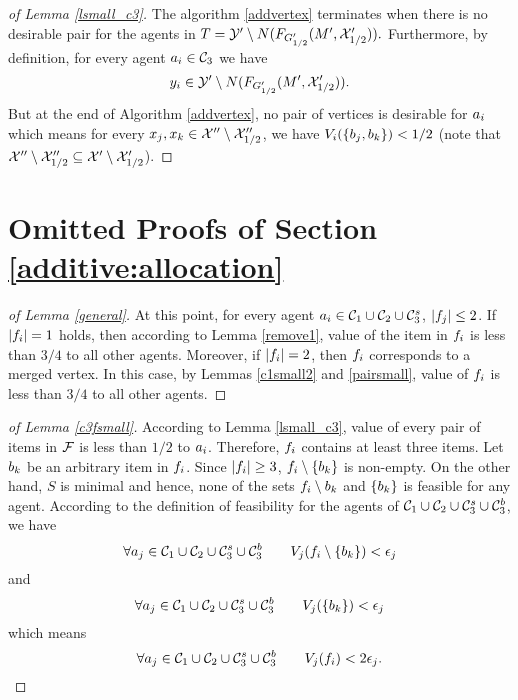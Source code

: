 \begin{proof}[of Lemma \ref{lsmall_c3}] The algorithm \ref{addvertex} terminates when there is no desirable pair for the agents in $T = \mathcal{Y}' \setminus N(F_{G'_{1/2}}(M',\mathcal{X}'_{1/2})).$ Furthermore, by definition, for every agent  $a_i \in \mathcal{C}_3$ we have  $$y_i \in \mathcal{Y}' \setminus N(F_{G'_{1/2}}(M',\mathcal{X}'_{1/2})).$$ But at the end of Algorithm \ref{addvertex}, no pair of vertices is desirable for $a_i$ which means for every $x_j,x_k \in \mathcal{X}'' \setminus \mathcal{X}''_{1/2}$, we have  $V_i(\{b_j,b_k\}) < {1/2}$ (note that $\mathcal{X}'' \setminus \mathcal{X}''_{1/2} \subseteq \mathcal{X}' \setminus \mathcal{X}'_{1/2}$).
\end{proof}


\section{Omitted Proofs of Section \ref{additive:allocation}}\label{clustering2appendix}
\begin{proof}[of Lemma \ref{general}]
At this point, for every agent $a_i \in \mathcal{C}_1 \cup \mathcal{C}_2 \cup \mathcal{C}_3^s$, $|f_j| \leq 2$. If $|f_i| = 1$ holds, then according to Lemma \ref{remove1}, value of the item in $f_i$ is less than $3/4$ to all other agents. Moreover, if $|f_i| = 2$, then $f_i$ corresponds to a merged vertex. In this case, by Lemmas \ref{c1small2} and \ref{pairsmall}, value of $f_i$ is less than $3/4$ to all other agents. 
\end{proof}

\begin{proof}[of Lemma \ref{c3fsmall}]
According to Lemma \ref{lsmall_c3}, value of every pair of items in $\mathcal{F}$ is less than $1/2$ to $a_i$. Therefore, $f_i$ contains at least three items. Let $b_k$ be an arbitrary item in $f_i$. Since $|f_i| \geq 3$, $f_i \setminus \{b_k\}$ is non-empty. On the other hand, $S$ is minimal and hence, none of the sets $f_i \setminus b_k$ and $\{b_k\}$ is feasible for any agent. According to the definition of feasibility for the agents of $\mathcal{C}_1 \cup \mathcal{C}_2 \cup \mathcal{C}_3^s \cup \mathcal{C}_3^b$, we have
$$ \forall a_j \in \mathcal{C}_1 \cup \mathcal{C}_2 \cup \mathcal{C}_3^s \cup \mathcal{C}_3^b \qquad V_j(f_i \setminus \{b_k\})< \epsilon_j $$ 
and 
$$\forall a_j \in \mathcal{C}_1 \cup \mathcal{C}_2 \cup \mathcal{C}_3^s \cup \mathcal{C}_3^b \qquad V_j(\{b_k\})< \epsilon_j$$
which means
$$ \forall a_j \in \mathcal{C}_1 \cup \mathcal{C}_2 \cup \mathcal{C}_3^s \cup \mathcal{C}_3^b \qquad V_j(f_i)< 2\epsilon_j. $$ 

\end{proof}

